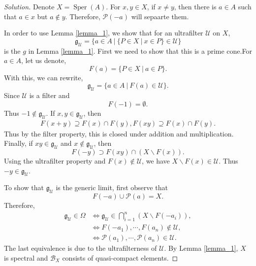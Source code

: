 \documentclass[8pt]{article}
\numberwithin{equation}{section}
\newenvironment{solution}{\begin{proof}[Solution]}{\end{proof}}
\DeclareMathOperator{\Sper}{Sper}
\newcommand{\U}[0]{\mathcal{U}}
\newcommand{\B}[0]{\mathcal{B}}
\newcommand{\sep}[0]{\:|\:}
\newcommand{\g}[0]{\mathfrak{g}}
\begin{document}
\begin{solution}
  Denote $X=\Sper(A)$. For $x,y\in X$, if $x\not=y$, then there is $a\in A$ such that $a\in x$ but $a\not\in y$. Therefore, $\mathcal{P}(-a)$ will sepaarte them.
  \par In order to use Lemma \ref{lemma_1}, we show that for an ultrafilter $\U$ on $X$,
  \begin{equation*}
    \g_\U = \{a\in A\sep \{P\in X\sep x\in P\}\in\U\}
  \end{equation*}
  is the $g$ in Lemma \ref{lemma_1}. First we need to show that this is a prime cone.For $a\in A$, let us denote,
  \begin{equation*}
  F(a) = \{P\in X\sep a\in P\}.
  \end{equation*}
  With this, we can rewrite,
  \begin{equation*}
    \g_\U = \{a\in A\sep F(a)\in\U\}.
  \end{equation*}
  Since $\U$ is a filter and 
  \begin{equation*}
    F(-1) = \emptyset.
  \end{equation*}
  Thus $-1\not\in \g_\U$. If $x,y\in\g_\U$, then 
  \begin{align*}
  F(x+y) \supseteq F(x)\cap F(y),F(xy)\supseteq F(x)\cap F(y).
  \end{align*}
  Thus by the filter property, this is closed under addition and multiplication. Finally, if $xy\in\g_\U$ and $x\not\in\g_\U$, then 
  \begin{equation*}
  F(-y) \supset F(xy)\cap (X\backslash F(x)).
  \end{equation*}
  Using the ultrafilter property and $F(x)\not\in \U$, we have $X\backslash F(x)\in\U$. Thus $-y\in\g_\U$. 
  \par To show that $\g_\U$ is the generic limit, first observe that 
  \begin{equation*}
  F(-a)\cup \mathcal{P}(a) = X.
  \end{equation*}
  Therefore, 
  \begin{align*}
    \g_\U\in\Omega &\iff \g_\U\in\bigcap_{i=1}^n (X\backslash F(-a_i)),\\
    & \iff F(-a_1),\cdots,F(a_n)\not\in \U,\\
    & \iff \mathcal{P}(a_1),\cdots,\mathcal{P}(a_n)\in\U.
  \end{align*}
  The last equivalence is due to the ultrafilterness of $\U$. By Lemma \ref{lemma_1}, $X$ is spectral and $\B_X$ consists of quasi-compact elements.
\end{solution}
\end{document}
